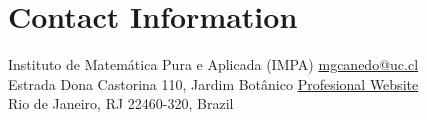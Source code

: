 \section{Contact Information}
Instituto de Matemática Pura e Aplicada (IMPA)     \hfill \href{mailto:mgcanedo@uc.cl}{mgcanedo@uc.cl}\\
Estrada Dona Castorina 110, Jardim Botânico   \hfill \href{https://sites.google.com/view/marcos-canedo-alcon/home}{Profesional Website}\\
Rio de Janeiro, RJ 22460-320, Brazil \hfill 


